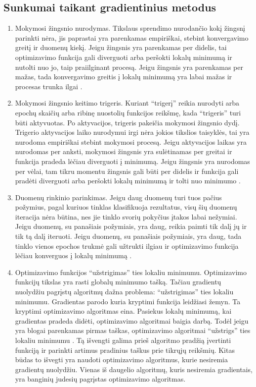\documentclass{VUMIFInfKursinis}
\begin{document}
\subsection{Sunkumai taikant gradientinius metodus}
\begin{enumerate}
\item Mokymosi žingsnio nurodymas. Tikslaus sprendimo nurodančio kokį žingsnį parinkti nėra, jis paprastai
yra parenkamas empiriškai, stebint konvergavimo greitį ir duomenų kiekį. Jeigu žingsnis yra parenkamas per didelis,
tai optimizavimo funkcija gali diverguoti arba peršokti lokalų minimumą ir nutolti nuo jo, taip praiilginant
procesą. Jeigu žingsnis yra parenkamas per mažas, tada konvergavimo greitis į lokalų minimumą yra labai mažas
ir procesas trunka ilgai \cite{salt17}.
\item Mokymosi žingsnio keitimo trigeris. Kuriant \enquote{trigerį} reikia nurodyti arba epochų skaičių arba ribinę nuostolių
funkcijos reikšmę, kada \enquote{trigeris} turi būti aktyvuotas. Po aktyvacijos, trigeris pakeičia mokymosi žingsnio dydį.
Trigerio aktyvacijos laiko nurodymui irgi nėra jokios tikslios taisyklės, tai yra nurodoma empiriškai stebint
mokymosi procesą. Jeigu aktyvacijos laikas yra nurodomas per anksti, mokymosi žingsnis yra sulėtinamas per greitai
ir funkcija pradeda lėčiau diverguoti į minimumą. Jeigu žingsnis yra nurodomas per vėlai, tam tikru momentu
žingsnis gali būti per didelis ir funkcija gali pradėti diverguoti arba peršokti lokalų minimumą ir tolti nuo
minimumo \cite{salt17}.
\item Duomenų rinkinio parinkimas. Jeigu daug duomenų turi tuos pačius požymius, pagal kuriuos tinklas klasifikuoja
rezultatus, visų šių duomenų iteracija nėra būtina, nes jie tinklo svorių pokyčius įtakos labai nežymiai.
Jeigu duomenų, su panašiais požymiais, yra daug, reikia paimti tik dalį jų ir tik tą dalį iteruoti. Jeigu
duomenų, su panašiais požymiais, yra daug, tada tinklo vienos epochos trukmė gali užtrukti ilgiau ir optimizavimo
funkcija lėčiau konverguos į lokalų minimumą \cite{salt17}.
\item Optimizavimo funkcijos \enquote{užstrigimas} ties lokaliu minimumu. Optimizavimo funkcijų tikslas yra rasti
globalų minimumo tašką. Tačiau gradientų nuolydžiu pagrįstų algoritmų dažna problema: \enquote{užstrigimas} ties
lokaliu minimumu. Gradientas parodo kuria kryptimi funkcija leidžiasi žemyn. Ta kryptimi optimizavimo algoritmas
eina. Pasiekus lokalų minimumą, kai gradientas pradeda didėti, optimizavimo algoritmai baigia darbą. Todėl jeigu yra
blogai parenkamas pirmas taškas, optimizavimo algoritmai \enquote{užstrigs} ties lokaliu minimumu \cite{salt17}. Tą išvengti galima prieš algoritmo pradžią
įvertinti funkciją ir parinkti artimus pradinius taškus prie tikrųjų reikšmių. Kitas būdas to išvegti yra naudoti
optimizavimo algoritmus, kurie nesiremia gradientų nuolydžiu. Vienas iš daugelio algoritmų, kuris nesiremia gradientais, yra
banginių judesių pagrįstas optimizavimo algoritmas.
\end{enumerate}
\end{document}
